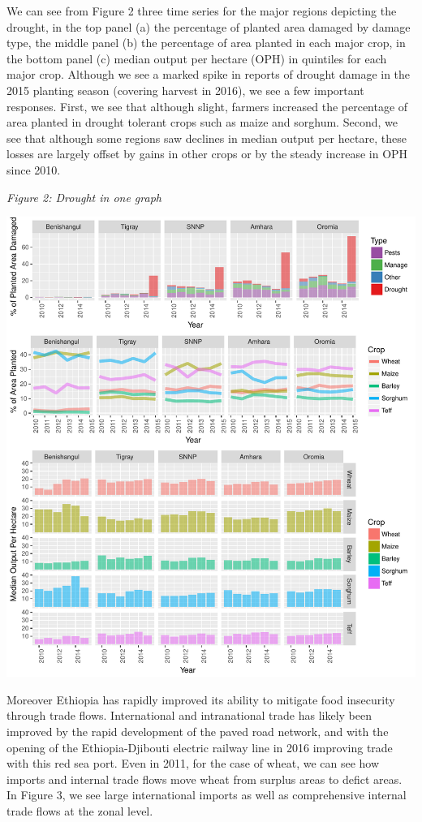 \documentclass[]{elsarticle} %
\makeatletter
\def\maxwidth{\ifdim\Gin@nat@width>\linewidth\linewidth
\else\Gin@nat@width\fi}
\let\Oldincludegraphics\includegraphics
\renewcommand{\includegraphics}[1]{\Oldincludegraphics[width=\maxwidth]{#1}}
\makeatother
\begin{document}
We can see from Figure 2 three time series for the major regions
depicting the drought, in the top panel (a) the percentage of planted
area damaged by damage type, the middle panel (b) the percentage of area
planted in each major crop, in the bottom panel (c) median output per
hectare (OPH) in quintiles for each major crop. Although we see a marked
spike in reports of drought damage in the 2015 planting season (covering
harvest in 2016), we see a few important responses. First, we see that
although slight, farmers increased the percentage of area planted in
drought tolerant crops such as maize and sorghum. Second, we see that
although some regions saw declines in median output per hectare, these
losses are largely offset by gains in other crops or by the steady
increase in OPH since 2010.

\newpage

\emph{Figure 2: Drought in one graph }

\includegraphics{IFPRI_2016_Report_Ethiopia_files/figure-latex/Drought in one graph figure-1.pdf}

\pagebreak

Moreover Ethiopia has rapidly improved its ability to mitigate food
insecurity through trade flows. International and intranational trade
has likely been improved by the rapid development of the paved road
network, and with the opening of the Ethiopia-Djibouti electric railway
line in 2016 improving trade with this red sea port. Even in 2011, for
the case of wheat, we can see how imports and internal trade flows move
wheat from surplus areas to defict areas. In Figure 3, we see large
international imports as well as comprehensive internal trade flows at
the zonal level.
\end{document}
